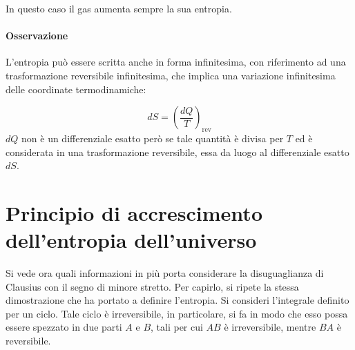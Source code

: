 In questo caso il gas aumenta sempre la sua entropia.

\paragraph{Osservazione} L'entropia può essere scritta anche in forma infinitesima, con riferimento ad una trasformazione reversibile infinitesima, che implica una variazione infinitesima delle coordinate termodinamiche:

\[
	dS = \left( \frac{dQ}{T} \right)_{\text{rev}}
\]
$dQ$ non è un differenziale esatto però se tale quantità è divisa per $T$ ed è considerata in una trasformazione reversibile, essa da luogo al differenziale esatto $dS$.

\section{Principio di accrescimento dell'entropia dell'universo}

Si vede ora quali informazioni in più porta considerare la disuguaglianza di Clausius con il segno di minore stretto.  Per capirlo, si ripete la stessa dimostrazione che ha portato a definire l'entropia. Si consideri l'integrale definito per un ciclo. Tale ciclo è irreversibile, in particolare, si fa in modo che esso possa essere spezzato in due parti $A$ e $B$, tali per cui $AB$ è irreversibile, mentre $BA$ è reversibile.

